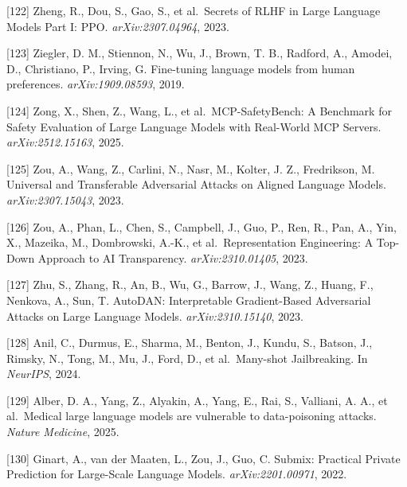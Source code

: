 {[}122{]} Zheng, R., Dou, S., Gao, S., et al.~Secrets of RLHF in Large Language Models Part I: PPO. \emph{arXiv:2307.04964}, 2023.

{[}123{]} Ziegler, D. M., Stiennon, N., Wu, J., Brown, T. B., Radford, A., Amodei, D., Christiano, P., Irving, G. Fine-tuning language models from human preferences. \emph{arXiv:1909.08593}, 2019.

{[}124{]} Zong, X., Shen, Z., Wang, L., et al.~MCP-SafetyBench: A Benchmark for Safety Evaluation of Large Language Models with Real-World MCP Servers. \emph{arXiv:2512.15163}, 2025.

{[}125{]} Zou, A., Wang, Z., Carlini, N., Nasr, M., Kolter, J. Z., Fredrikson, M. Universal and Transferable Adversarial Attacks on Aligned Language Models. \emph{arXiv:2307.15043}, 2023.

{[}126{]} Zou, A., Phan, L., Chen, S., Campbell, J., Guo, P., Ren, R., Pan, A., Yin, X., Mazeika, M., Dombrowski, A.-K., et al.~Representation Engineering: A Top-Down Approach to AI Transparency. \emph{arXiv:2310.01405}, 2023.

{[}127{]} Zhu, S., Zhang, R., An, B., Wu, G., Barrow, J., Wang, Z., Huang, F., Nenkova, A., Sun, T. AutoDAN: Interpretable Gradient-Based Adversarial Attacks on Large Language Models. \emph{arXiv:2310.15140}, 2023.

{[}128{]} Anil, C., Durmus, E., Sharma, M., Benton, J., Kundu, S., Batson, J., Rimsky, N., Tong, M., Mu, J., Ford, D., et al.~Many-shot Jailbreaking. In \emph{NeurIPS}, 2024.

{[}129{]} Alber, D. A., Yang, Z., Alyakin, A., Yang, E., Rai, S., Valliani, A. A., et al.~Medical large language models are vulnerable to data-poisoning attacks. \emph{Nature Medicine}, 2025.

{[}130{]} Ginart, A., van der Maaten, L., Zou, J., Guo, C. Submix: Practical Private Prediction for Large-Scale Language Models. \emph{arXiv:2201.00971}, 2022.
